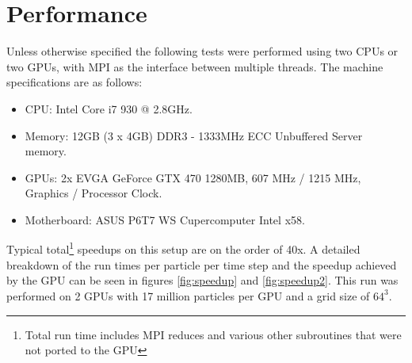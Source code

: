 \chapter{Performance}
\label{ch:performance} 
	Unless otherwise specified the following tests were performed using two CPUs or two GPUs, with MPI as the interface between multiple threads. The machine specifications are as follows:
\begin{itemize}
	\item CPU: Intel Core i7 930 @ 2.8GHz.
	\item Memory: 12GB (3 x 4GB) DDR3 - 1333MHz ECC Unbuffered Server memory. 
	\item GPUs: 2x EVGA GeForce GTX 470 1280MB, 607 MHz / 1215 MHz, Graphics / Processor Clock. 
	\item Motherboard: ASUS P6T7 WS Cupercomputer Intel x58.
\end{itemize}

Typical total\footnote[1]{Total run time includes MPI reduces and various other subroutines that were not ported to the GPU} speedups on this setup are on the order of 40x. A detailed breakdown of the run times per particle per time step and the speedup achieved by the GPU can be seen in figures \ref{fig:speedup} and \ref{fig:speedup2}. This run was performed on 2 GPUs with 17 million particles per GPU and a grid size of $64^3$.

